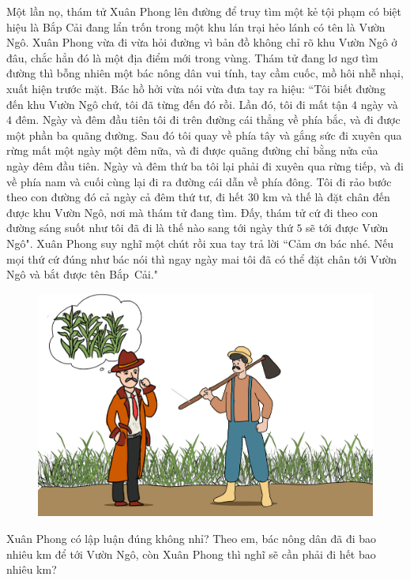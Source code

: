 \begin{multicols}{2}
	Một lần nọ, thám tử Xuân Phong lên đường để truy tìm một kẻ tội phạm có biệt hiệu là Bắp Cải đang lẩn trốn trong một khu lán trại hẻo lánh có tên là Vườn Ngô. Xuân Phong vừa đi vừa hỏi đường vì bản đồ không chỉ rõ khu Vườn Ngô ở đâu, chắc hẳn đó là một địa điểm mới trong vùng. Thám tử đang lơ ngơ tìm đường thì bỗng nhiên một bác nông dân vui tính, tay cầm cuốc, mồ hôi nhễ nhại, xuất hiện trước mặt. Bác hồ hởi vừa nói vừa đưa tay ra hiệu: ``Tôi biết đường đến khu Vườn Ngô chứ, tôi đã từng đến đó rồi. Lần đó, tôi đi mất  tận $4$ ngày và $4$ đêm. Ngày và đêm đầu tiên tôi đi trên đường cái thẳng về phía bắc, và đi được một phần ba quãng đường. Sau đó tôi quay về phía tây và gắng sức đi xuyên qua rừng mất một ngày một đêm nữa, và đi được quãng đường chỉ bằng nửa của ngày đêm đầu tiên. Ngày và đêm thứ ba tôi lại phải đi xuyên qua rừng tiếp, và đi về phía nam và cuối cùng lại đi ra đường cái dẫn về phía đông. Tôi đi rảo bước theo con đường đó cả ngày cả đêm thứ tư, đi hết $30$ km và thế là đặt chân đến được khu Vườn Ngô, nơi mà thám tử đang tìm. Đấy, thám tử cứ đi theo con đường sáng suốt như tôi đã đi là thế nào sang tới ngày thứ $5$ sẽ tới được Vườn Ngô".
	\vskip 0.1cm
	Xuân Phong suy nghĩ một chút rồi xua tay trả lời ``Cảm ơn bác nhé. Nếu mọi thứ cứ đúng như bác nói thì ngay ngày mai tôi đã có thể đặt chân tới Vườn Ngô và bắt được tên Bắp~Cải."
	\begin{figure}[H]
		\centering
		\vspace*{-5pt}
		\captionsetup{labelformat= empty, justification=centering}
		\includegraphics[width=1\linewidth]{xp}
		\vspace*{-15pt}
	\end{figure}
	Xuân Phong có lập luận đúng không nhỉ? Theo em, bác nông dân đã đi bao nhiêu km để tới Vườn Ngô, còn Xuân Phong thì nghĩ sẽ cần phải đi hết bao nhiêu km?
\end{multicols}
